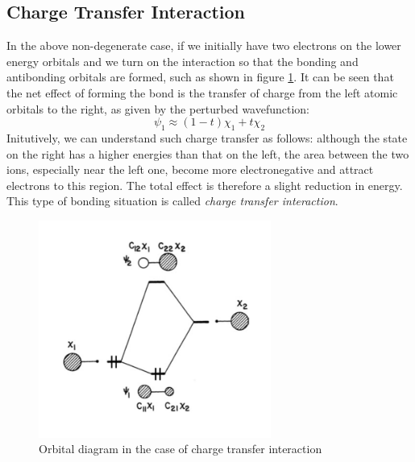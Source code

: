 \documentclass{article}
\begin{document}
\subsection{Charge Transfer Interaction}
In the above non-degenerate case, if we initially have two electrons on 
the lower energy orbitals and we turn on the interaction so that the bonding 
and antibonding orbitals are formed, such as shown in figure \ref{F:charge_transfer}. 
It can be seen that the net effect of forming the bond is the transfer of charge 
from the left atomic orbitals to the right, as given by the perturbed wavefunction:
\begin{equation*}
    \psi_1 \approx (1-t) \chi_1 + t \chi_2
\end{equation*}
Initutively, we can understand such charge transfer as follows: although the 
state on the right has a higher energies than that on the left, the area between 
the two ions, especially near the left one, become more electronegative and attract 
electrons to this region. The total effect is therefore a slight reduction in 
energy. This type of bonding situation is called \emph{charge transfer interaction}.
\begin{figure}[h!]
    \centering
    \includegraphics[width=3in]{figures/F_charge_transfer.png}
    \caption{Orbital diagram in the case of charge transfer interaction}
    \label{F:charge_transfer}
\end{figure}
\end{document}
